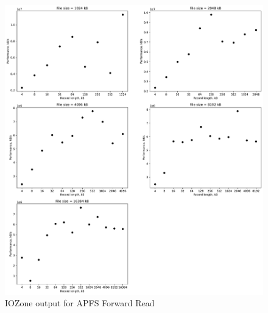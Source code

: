 \begin{figure}[!htb]
	\label{fig:app_beapfs_ffs_read}
	\begin{center}
		\includegraphics[width=1.0\textwidth]{figures/benchmarking/local/Read.pdf}
	\end{center}
	\caption{IOZone output for APFS Forward Read}
\end{figure}

